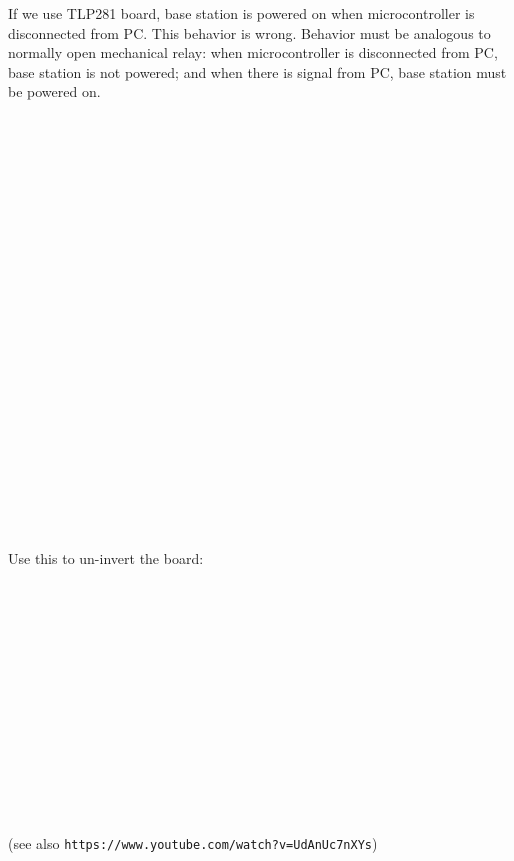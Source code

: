 \nopagenumbers
If we use TLP281 board, base station is powered on when microcontroller is disconnected from PC.
This behavior is wrong. Behavior must be analogous to normally open mechanical relay: when
microcontroller is disconnected from PC, base station is not powered; and when
there is signal from PC, base station must be powered on.
$$\hbox to16cm{\vbox to5.82cm{\vfil\special{psfile=tlp2.eps
  clip llx=0 lly=0 urx=863 ury=314 rwi=4535}}\hfil}$$
$$\hbox to15.38cm{\vbox to7.26722222222222cm{\vfil\special{psfile=tlp1.eps
  clip llx=0 lly=0 urx=436 ury=206 rwi=4360}}\hfil}$$
Use this to un-invert the board:
$$\hbox to7.26cm{\vbox to6.24416666666667cm{\vfil\special{psfile=TLP281.1
  clip llx=-1 lly=-33 urx=205 ury=144 rwi=2060}}\hfil}$$
\vfil
(see also {\tt https://www.youtube.com/watch?v=UdAnUc7nXYs})
\bye
